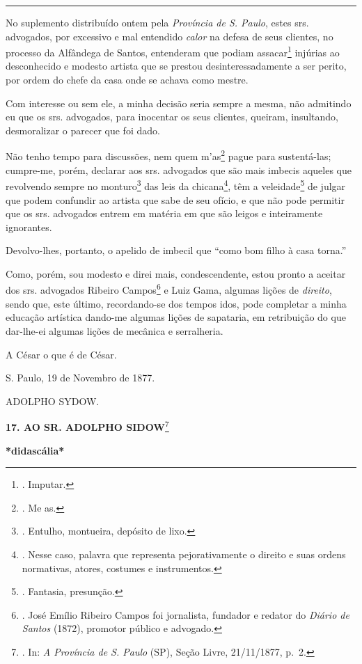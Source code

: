 \begin{center}\rule{0.5\linewidth}{\linethickness}\end{center}

No suplemento distribuído ontem pela \emph{Província de S. Paulo}, estes
srs. advogados, por excessivo e mal entendido \emph{calor} na defesa de
seus clientes, no processo da Alfândega de Santos, entenderam que podiam
assacar\footnote{. Imputar.} injúrias ao desconhecido e modesto artista
que se prestou desinteressadamente a ser perito, por ordem do chefe da
casa onde se achava como mestre.

Com interesse ou sem ele, a minha decisão seria sempre a mesma, não
admitindo eu que os srs. advogados, para inocentar os seus clientes,
queiram, insultando, desmoralizar o parecer que foi dado.

Não tenho tempo para discussões, nem quem m'as\footnote{. Me as.} pague
para sustentá-las; cumpre-me, porém, declarar aos srs. advogados que são
mais imbecis aqueles que revolvendo sempre no monturo\footnote{.
  Entulho, montueira, depósito de lixo.} das leis da chicana\footnote{.
  Nesse caso, palavra que representa pejorativamente o direito e suas
  ordens normativas, atores, costumes e instrumentos.}, têm a
veleidade\footnote{. Fantasia, presunção.} de julgar que podem confundir
ao artista que sabe de seu ofício, e que não pode permitir que os srs.
advogados entrem em matéria em que são leigos e inteiramente ignorantes.

Devolvo-lhes, portanto, o apelido de imbecil que ``como bom filho à casa
torna.''

Como, porém, sou modesto e direi mais, condescendente, estou pronto a
aceitar dos srs. advogados Ribeiro Campos\footnote{. José Emílio Ribeiro
  Campos foi jornalista, fundador e redator do \emph{Diário de Santos}
  (1872), promotor público e advogado.} e Luiz Gama, algumas lições de
\emph{direito}, sendo que, este último, recordando-se dos tempos idos,
pode completar a minha educação artística dando-me algumas lições de
sapataria, em retribuição do que dar-lhe-ei algumas lições de mecânica e
serralheria.

A César o que é de César.

S. Paulo, 19 de Novembro de 1877.

ADOLPHO SYDOW.

\textbf{17. AO SR. ADOLPHO SIDOW}\footnote{. In: \emph{A Província de S.
  Paulo} (SP), Seção Livre, 21/11/1877, p.~2.}

\textbf{*didascália*}

